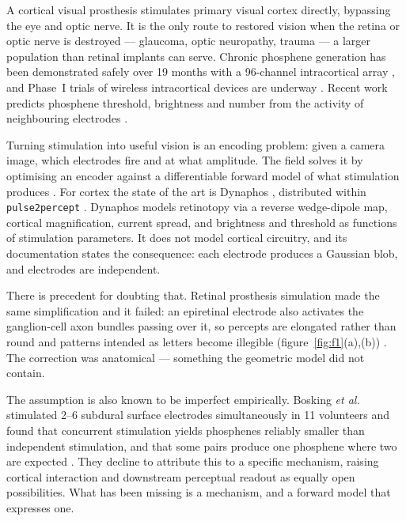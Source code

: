 \documentclass[10pt,twocolumn]{article}
\newcommand{\pptwo}{\texttt{pulse2percept}}
\begin{document}
A cortical visual prosthesis stimulates primary visual cortex directly,
bypassing the eye and optic nerve. It is the only route to restored vision
when the retina or optic nerve is destroyed --- glaucoma, optic neuropathy,
trauma --- a larger population than retinal implants can serve. Chronic
phosphene generation has been demonstrated safely over 19 months with a
96-channel intracortical array \citep{fernandez2019,nct02983370}, and Phase~I
trials of wireless intracortical devices are underway \citep{nct04634383}.
Recent work predicts phosphene threshold, brightness and number from the
activity of neighbouring electrodes \citep{scienceadv2025}.

Turning stimulation into useful vision is an encoding problem: given a
camera image, which electrodes fire and at what amplitude. The field solves
it by optimising an encoder against a differentiable forward model of what
stimulation produces \citep{granley2022,deruyter2022,rl2022,e2e2025}. For
cortex the state of the art is Dynaphos \citep{vandergrinten2023},
distributed within \pptwo{} \citep{beyeler}. Dynaphos models retinotopy via
a reverse wedge-dipole map, cortical magnification, current spread, and
brightness and threshold as functions of stimulation parameters. It does not
model cortical circuitry, and its documentation states the consequence: each
electrode produces a Gaussian blob, and electrodes are independent.

There is precedent for doubting that. Retinal prosthesis simulation made the
same simplification and it failed: an epiretinal electrode also activates
the ganglion-cell axon bundles passing over it, so percepts are elongated
rather than round and patterns intended as letters become illegible
(figure~\ref{fig:f1}(a),(b)) \citep{beyeler}. The correction was anatomical
--- something the geometric model did not contain.

The assumption is also known to be imperfect empirically. Bosking
\textit{et al.} stimulated 2--6 subdural surface electrodes simultaneously in
11 volunteers and found that concurrent stimulation yields phosphenes
reliably smaller than independent stimulation, and that some pairs produce
one phosphene where two are expected \citep{bosking2022}. They decline to
attribute this to a specific mechanism, raising cortical interaction and
downstream perceptual readout as equally open possibilities. What has been
missing is a mechanism, and a forward model that expresses one.
\end{document}
